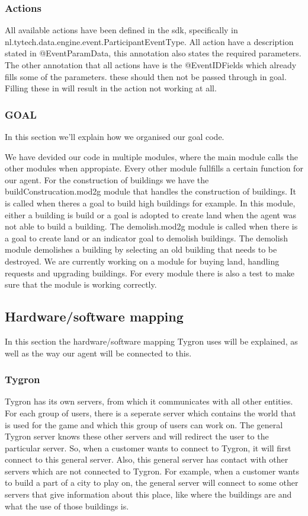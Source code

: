 \subsubsection{Actions}

All available actions have been defined in the sdk, specifically in \\nl.tytech.data.engine.event.ParticipantEventType. All action have a description stated in @EventParamData, this annotation also states the required parameters. The other annotation that all actions have is the @EventIDFields which already fills some of the parameters. these should then not be passed through in goal. Filling these in will result in the action not working at all.

\subsubsection{GOAL}

In this section we'll explain how we organised our goal code.

We have devided our code in multiple modules, where the main module calls the other modules when appropiate. 
Every other module fullfills a certain function for our agent. 
For the construction of buildings we have the buildConstrucation.mod2g module that handles the construction of buildings. It is called when theres a goal to build high buildings for example. In this module, either a building is build or a goal is adopted to create land when the agent was not able to build a building.
The demolish.mod2g module is called when there is a goal to create land or an indicator goal to demolish buildings. The demolish module demolishes a building by selecting an old building that needs to be destroyed. We are currently working on a module for buying land, handling requests and upgrading buildings.
For every module there is also a test to make sure that the module is working correctly.

\newpage
\subsection{Hardware/software mapping}
In this section the hardware/software mapping Tygron uses will be explained, as well as the way our agent will be connected to this.

\subsubsection{Tygron}
Tygron has its own servers, from which it communicates with all other entities. For each group of users, there is a seperate server which contains the world that is used for the game and which this group of users can work on. The general Tygron server knows these other servers and will redirect the user to the particular server. So, when a customer wants to connect to Tygron, it will first connect to this general server. Also, this general server has contact with other servers which are not connected to Tygron. For example, when a customer wants to build a part of a city to play on, the general server will connect to some other servers that give information about this place, like where the buildings are and what the use of those buildings is. 

